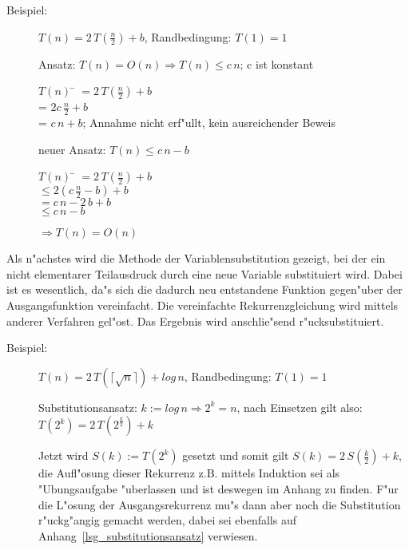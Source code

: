 \documentclass[draft,12pt]{scrreprt}
\theoremstyle{break}
\begin{document}
	\begin{description}
		\item [Beispiel:] $T(n) = 2\, T\left(\frac{n}{2}\right) + b$, Randbedingung: $T(1)=1$

		Ansatz: $T(n)=O(n)\Rightarrow T(n)\leq c\, n$; c ist konstant
		\begin{tabbing}
			$T(n)$ \= $= 2\, T(\frac{n}{2})+b$\\
			\> = $2c\, \frac{n}{2} +b$\\
			\> = $c\, n+b$; Annahme nicht erf"ullt, kein ausreichender Beweis
		\end{tabbing}
		neuer Ansatz: $T(n)\leq c\, n-b$
		\begin{tabbing}
			$T(n)$ \= $=2\, T\left(\frac{n}{2} \right)+b$\\
			\> $\leq 2\left(c\, \frac{n}{2}-b\right)+b$\\
			\> $=c\, n-2\, b+b$\\
			\> $\leq c\, n-b$
		\end{tabbing}
		$\Rightarrow T(n)=O(n)$
	\end{description}
			
Als n"achstes wird die Methode der Variablensubstitution gezeigt,
bei der ein nicht elementarer Teilausdruck durch eine neue Variable substituiert wird. Dabei ist es wesentlich, da"s
sich die dadurch neu entstandene Funktion gegen"uber der Ausgangsfunktion vereinfacht. Die vereinfachte Rekurrenzgleichung wird
mittels anderer Verfahren gel"ost. Das Ergebnis wird anschlie"send r"ucksubstituiert.
	\begin{description}
		\item [Beispiel:] $T(n) = 2\, T(\lceil\sqrt{n}\rceil) + log\,n$, Randbedingung: $T(1)=1$

		Substitutionsansatz: $k:=log\,n \Rightarrow 2^k=n$, nach Einsetzen gilt also: $T(2^k) = 2\, T(2^{\frac{k}{2}})+k$
		
		Jetzt wird $S(k) := T(2^k)$ gesetzt und somit gilt $S(k) = 2\, S\left(\frac{k}{2}\right)+k$, die Aufl"osung dieser
		Rekurrenz z.B. mittels Induktion sei als "Ubungsaufgabe "uberlassen und ist deswegen im Anhang zu finden. 
		F"ur die L"osung der Ausgangsrekurrenz mu"s dann aber noch die Substitution r"uckg"angig gemacht werden, dabei sei
		ebenfalls auf Anhang~\ref{lsg_substitutionsansatz} verwiesen. 
	\end{description}	
\end{document}
